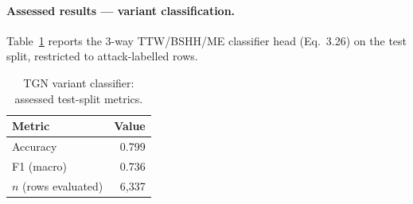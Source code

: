 \paragraph{Assessed results --- variant classification.}
Table~\ref{tab:tgn-val2-variant} reports the 3-way TTW/BSHH/ME classifier
head (Eq.~3.26) on the test split, restricted to attack-labelled rows.

\begin{table}[htbp]
\centering
\caption{TGN variant classifier: assessed test-split metrics.}
\label{tab:tgn-val2-variant}
\begin{tabular}{@{}lr@{}}
\toprule
Metric & Value \\
\midrule
Accuracy       & 0.799 \\
F1 (macro)     & 0.736 \\
$n$ (rows evaluated) & 6{,}337 \\
\bottomrule
\end{tabular}
\end{table}

